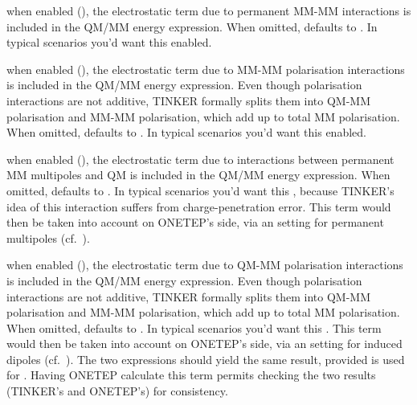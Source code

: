 \documentclass[letterpaper,10pt,english]{sphinxmanual}
\begin{document}
  \textendash{} when
enabled (), the electrostatic term due to permanent MM-MM
interactions is included in the QM/MM energy expression. When omitted,
defaults to . In typical scenarios you’d want this enabled.

  \textendash{} when
enabled (), the electrostatic term due to MM-MM polarisation
interactions is included in the QM/MM energy expression. Even though
polarisation interactions are not additive, TINKER formally splits them
 into QM-MM polarisation and MM-MM polarisation, which add
up to total MM polarisation. When omitted, defaults to . In typical
scenarios you’d want this enabled.

  \textendash{}
when enabled (), the electrostatic term due to interactions between
permanent MM multipoles and QM is included in the QM/MM energy
expression. When omitted, defaults to . In typical scenarios you’d
want this , because TINKER’s idea of this interaction
suffers from charge-penetration error. This term would then be taken
into account on ONETEP’s side, via an 
setting for permanent multipoles (cf. ).

  \textendash{} when
enabled (), the electrostatic term due to QM-MM polarisation
interactions is included in the QM/MM energy expression. Even though
polarisation interactions are not additive, TINKER formally splits them
 into QM-MM polarisation and MM-MM polarisation, which add
up to total MM polarisation. When omitted, defaults to . In typical
scenarios you’d want this . This term would then be taken
into account on ONETEP’s side, via an 
setting for induced dipoles (cf. ). The two
expressions should yield the same result, provided  is used
for . Having ONETEP calculate this term
permits checking the two results (TINKER’s and ONETEP’s) for
consistency.
\end{document}
